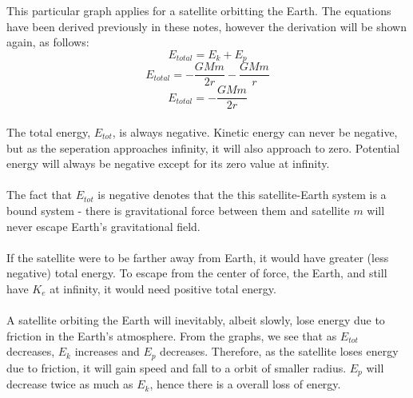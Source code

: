 \documentclass{article}
\begin{document}
This particular graph applies for a satellite orbitting the Earth. The equations have been derived previously in these notes, however the derivation will be shown again, as follows:
\begin{equation}
    E_{total}=E_k+E_p
\end{equation}
\begin{equation}
    E_{total}=-\frac{GMm}{2r}-\frac{GMm}{r}
\end{equation}
\begin{equation}
    E_{total}=-\frac{GMm}{2r}
\end{equation}
\\
The total energy, $E_{tot}$, is always negative. Kinetic energy can never be negative, but as the seperation approaches infinity, it will also approach to zero. Potential energy will always be negative except for its zero value at infinity.
\\
\\The fact that $E_{tot}$ is negative denotes that the this satellite-Earth system is a bound system - there is gravitational force between them and satellite $m$ will never escape Earth's gravitational field.
\\
\\If the satellite were to be farther away from Earth, it would have greater (less negative) total energy. To escape from the center of force, the Earth, and still have $K_e$ at infinity, it would need positive total energy.
\\
\\A satellite orbiting the Earth will inevitably, albeit slowly, lose energy due to friction in the Earth's atmosphere. From the graphs, we see that as $E_{tot}$ decreases, $E_k$ increases and $E_p$ decreases. Therefore, as the satellite loses energy due to friction, it will gain speed and fall to a orbit of smaller radius. $E_p$ will decrease twice as much as $E_k$, hence there is a overall loss of energy.
\end{document}
